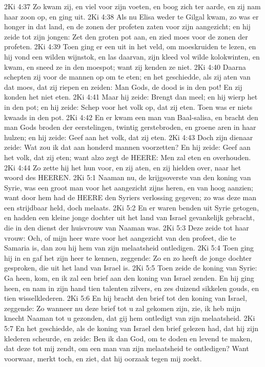 2Ki 4:37  Zo kwam zij, en viel voor zijn voeten, en boog zich ter aarde, en zij nam haar zoon op, en ging uit.
2Ki 4:38  Als nu Elisa weder te Gilgal kwam, zo was er honger in dat land, en de zonen der profeten zaten voor zijn aangezicht; en hij zeide tot zijn jongen: Zet den groten pot aan, en zied moes voor de zonen der profeten.
2Ki 4:39  Toen ging er een uit in het veld, om moeskruiden te lezen, en hij vond een wilden wijnstok, en las daarvan, zijn kleed vol wilde kolokwinten, en kwam, en sneed ze in den moespot; want zij kenden ze niet.
2Ki 4:40  Daarna schepten zij voor de mannen op om te eten; en het geschiedde, als zij aten van dat moes, dat zij riepen en zeiden: Man Gods, de dood is in den pot! En zij konden het niet eten.
2Ki 4:41  Maar hij zeide: Brengt dan meel; en hij wierp het in den pot; en hij zeide: Schep voor het volk op, dat zij eten. Toen was er niets kwaads in den pot.
2Ki 4:42  En er kwam een man van Baal-salisa, en bracht den man Gods broden der eerstelingen, twintig gerstebroden, en groene aren in haar hulzen; en hij zeide: Geef aan het volk, dat zij eten.
2Ki 4:43  Doch zijn dienaar zeide: Wat zou ik dat aan honderd mannen voorzetten? En hij zeide: Geef aan het volk, dat zij eten; want alzo zegt de HEERE: Men zal eten en overhouden.
2Ki 4:44  Zo zette hij het hun voor, en zij aten, en zij hielden over, naar het woord des HEEREN.
2Ki 5:1  Naaman nu, de krijgsoverste van den koning van Syrie, was een groot man voor het aangezicht zijns heren, en van hoog aanzien; want door hem had de HEERE den Syriers verlossing gegeven; zo was deze man een strijdbaar held, doch melaats.
2Ki 5:2  En er waren benden uit Syrie getogen, en hadden een kleine jonge dochter uit het land van Israel gevankelijk gebracht, die in den dienst der huisvrouw van Naaman was.
2Ki 5:3  Deze zeide tot haar vrouw: Och, of mijn heer ware voor het aangezicht van den profeet, die te Samaria is, dan zou hij hem van zijn melaatsheid ontledigen.
2Ki 5:4  Toen ging hij in en gaf het zijn heer te kennen, zeggende: Zo en zo heeft de jonge dochter gesproken, die uit het land van Israel is.
2Ki 5:5  Toen zeide de koning van Syrie: Ga heen, kom, en ik zal een brief aan den koning van Israel zenden. En hij ging heen, en nam in zijn hand tien talenten zilvers, en zes duizend sikkelen gouds, en tien wisselklederen.
2Ki 5:6  En hij bracht den brief tot den koning van Israel, zeggende: Zo wanneer nu deze brief tot u zal gekomen zijn, zie, ik heb mijn knecht Naaman tot u gezonden, dat gij hem ontledigt van zijn melaatsheid.
2Ki 5:7  En het geschiedde, als de koning van Israel den brief gelezen had, dat hij zijn klederen scheurde, en zeide: Ben ik dan God, om te doden en levend te maken, dat deze tot mij zendt, om een man van zijn melaatsheid te ontledigen? Want voorwaar, merkt toch, en ziet, dat hij oorzaak tegen mij zoekt.
